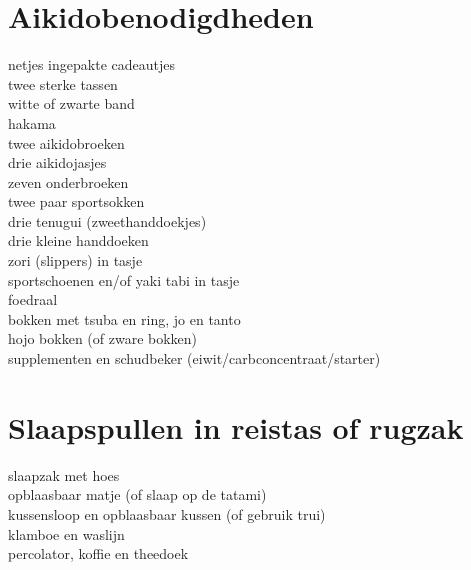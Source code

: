 \documentclass[9pt,twocolumn]{memoir}
\begin{document}
\section*{Aikidobenodigdheden}%
netjes ingepakte cadeautjes\\%
twee sterke tassen\\%
witte of zwarte band\\%
hakama\\%
twee aikidobroeken\\%
drie aikidojasjes\\%
zeven onderbroeken\\%
twee paar sportsokken\\%
drie tenugui (zweethanddoekjes)\\%
drie kleine handdoeken\\%
zori (slippers) in tasje\\%
sportschoenen en/of yaki tabi in tasje\\%
foedraal\\%
bokken met tsuba en ring, jo en tanto\\%
hojo bokken (of zware bokken)\\%
supplementen en schudbeker (eiwit/carbconcentraat/starter)%

\section*{Slaapspullen in reistas of rugzak}%
slaapzak met hoes\\%
opblaasbaar matje (of slaap op de tatami)\\%
kussensloop en opblaasbaar kussen (of gebruik trui)\\%
klamboe en waslijn\\%
percolator, koffie en theedoek%
\end{document}
